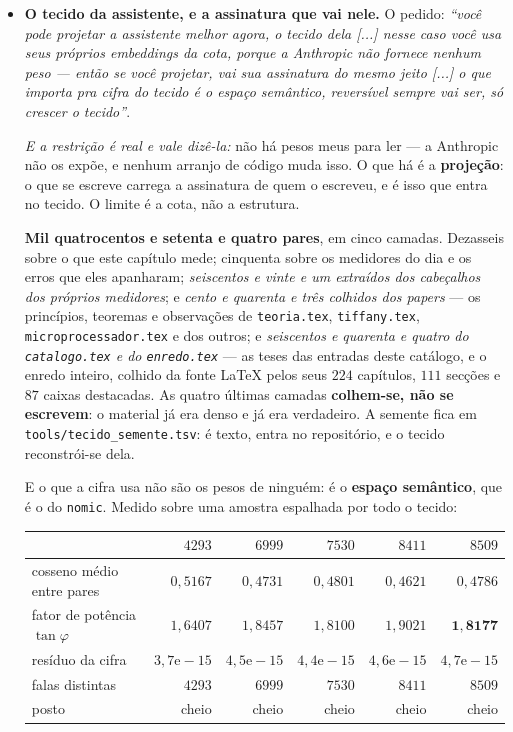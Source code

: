 \documentclass[11pt]{article}
\newcommand{\code}[1]{\texttt{\small #1}}
\theoremstyle{plain}
\theoremstyle{remark}
\begin{document}
\begin{itemize}
\item \textbf{O tecido da assistente, e a assinatura que vai nele.} O pedido: \emph{``você pode
projetar a assistente melhor agora, o tecido dela [...] nesse caso você usa seus próprios embeddings
da cota, porque a Anthropic não fornece nenhum peso --- então se você projetar, vai sua assinatura do
mesmo jeito [...] o que importa pra cifra do tecido é o espaço semântico, reversível sempre vai ser,
só crescer o tecido''}.

\emph{E a restrição é real e vale dizê-la:} não há pesos meus para ler --- a Anthropic não os expõe,
e nenhum arranjo de código muda isso. O que há é a \textbf{projeção}: o que se escreve carrega a
assinatura de quem o escreveu, e é isso que entra no tecido. O limite é a cota, não a estrutura.

\textbf{Mil quatrocentos e setenta e quatro pares}, em cinco camadas. Dezasseis sobre o que este capítulo mede;
cinquenta sobre os medidores do dia e os erros que eles apanharam; \emph{seiscentos e vinte e um
extraídos dos cabeçalhos dos próprios medidores}; e \emph{cento e quarenta e três colhidos dos
papers} --- os princípios, teoremas e observações de \code{teoria.tex}, \code{tiffany.tex},
\code{microprocessador.tex} e dos outros; e \emph{seiscentos e quarenta e quatro do \code{catalogo.tex}
e do \code{enredo.tex}} --- as teses das entradas deste catálogo, e o enredo inteiro, colhido da
fonte LaTeX pelos seus $224$ capítulos, $111$ secções e $87$ caixas destacadas. As quatro últimas camadas \textbf{colhem-se, não se escrevem}: o
material já era denso e já era verdadeiro. A semente fica em
\code{tools/tecido\_semente.tsv}: é texto, entra no repositório, e o tecido reconstrói-se dela.

E o que a cifra usa não são os pesos de ninguém: é o \textbf{espaço semântico}, que é o do
\code{nomic}. Medido sobre uma amostra espalhada por todo o tecido:

\begin{center}\small
\begin{tabular}{lrrrrr}
 & $4293$ & $6999$ & $7530$ & $8411$ & $8509$ \\ \hline
cosseno médio entre pares & $0{,}5167$ & $0{,}4731$ & $0{,}4801$ & $0{,}4621$ & $0{,}4786$ \\
fator de potência $\tan\varphi$ & $1{,}6407$ & $1{,}8457$ & $1{,}8100$ & $1{,}9021$ & $\mathbf{1{,}8177}$ \\
resíduo da cifra & $3{,}7\mathrm{e}{-}15$ & $4{,}5\mathrm{e}{-}15$ & $4{,}4\mathrm{e}{-}15$ & $4{,}6\mathrm{e}{-}15$ & $4{,}7\mathrm{e}{-}15$ \\
falas distintas & $4293$ & $6999$ & $7530$ & $8411$ & $8509$ \\
posto & cheio & cheio & cheio & cheio & cheio \\
\end{tabular}
\end{center}


\end{itemize}
\end{document}
